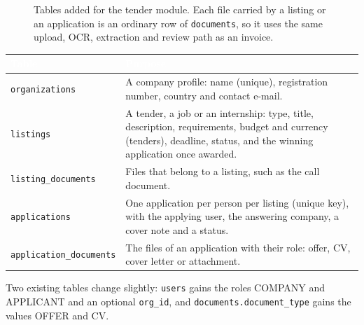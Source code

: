 \documentclass[11pt,a4paper]{report}
\newcommand{\hdr}[1]{\textcolor{white}{\sffamily\bfseries #1}}
\newcommand{\tblstart}{\rowcolors{2}{white}{rowgray}\arrayrulecolor{teal!60}}
\newcommand{\hdrrow}{\rowcolor{navy}}
\begin{document}
\begin{figure}[H]
{
}
\caption{Tables added for the tender module. Each file carried by a listing or an application is an ordinary row of \texttt{documents}, so it uses the same upload, OCR, extraction and review path as an invoice.}\label{fig:p2tender}
\end{figure}

{\tblstart\small
\begin{longtable}{L{3.8cm}L{10.0cm}}
\hdrrow \hdr{Table} & \hdr{Purpose}\\ \endhead
\texttt{organizations} & A company profile: name (unique), registration number, country and contact e-mail.\\
\texttt{listings} & A tender, a job or an internship: type, title, description, requirements, budget and currency (tenders), deadline, status, and the winning application once awarded.\\
\texttt{listing\_documents} & Files that belong to a listing, such as the call document.\\
\texttt{applications} & One application per person per listing (unique key), with the applying user, the answering company, a cover note and a status.\\
\texttt{application\_documents} & The files of an application with their role: offer, CV, cover letter or attachment.\\
\hline
\end{longtable}}
Two existing tables change slightly: \texttt{users} gains the roles COMPANY and APPLICANT and an optional \texttt{org\_id}, and \texttt{documents.document\_type} gains the values OFFER and CV.
\end{document}
